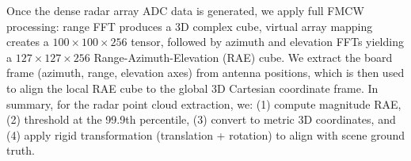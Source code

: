 Once the dense radar array ADC data is generated, we apply full FMCW processing: range FFT produces a 3D complex cube, virtual array mapping creates a $100 \times 100 \times 256$ tensor, followed by azimuth and elevation FFTs yielding a $127 \times 127 \times 256$ Range-Azimuth-Elevation (RAE) cube. We extract the board frame (azimuth, range, elevation axes) from antenna positions, which is then used to align the local RAE cube to the global 3D Cartesian coordinate frame. In summary, for the radar point cloud extraction, we: (1) compute magnitude RAE, (2) threshold at the 99.9th percentile, (3) convert to metric 3D coordinates, and (4) apply rigid transformation (translation + rotation) to align with scene ground truth.




